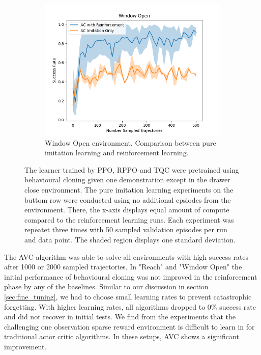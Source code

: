 \begin{figure}[htbp]
\begin{subfigure}[t]{0.45\textwidth}
      \includegraphics[width=\textwidth]{images/1_2000_imi/Window Open.png}
      \caption{Window Open environment. Comparison between pure imitation learning and reinforcement learning.}
    \end{subfigure}
    \caption{
    The learner trained by PPO, RPPO and TQC were pretrained using behavioural cloning given one demonstration except in the drawer close environment. 
    The pure imitation learning experiments on the buttom row were conducted using no additional epsiodes from the environment. There, the x-axis 
    displays equal amount of compute compared to the reinforcement learning runs.
    Each experiment was repeatet three times with 
    50 sampled validation episodes per run and data point. The shaded region displays one standard deviation.}
    \label{fig:guided_ref}
\end{figure}

The AVC algorithm was able to solve all environments with high success rates after 1000 or 2000 sampled trajectories. In "Reach" and "Window Open" the initial performance
of behavioural cloning was not improved in the reinforcement phase by any of the baselines. Similar to our discussion in section \ref{sec:fine_tuning},
we had to choose small learning rates to prevent catastrophic forgetting. With higher learning rates, all algorithms dropped to $0 \%$ success rate and did
not recover in initial tests. We find from the experiments that the challenging one observation sparse reward environment is difficult to learn in for
traditional actor critic algorithms. In these setups, AVC shows a significant improvement.\\

